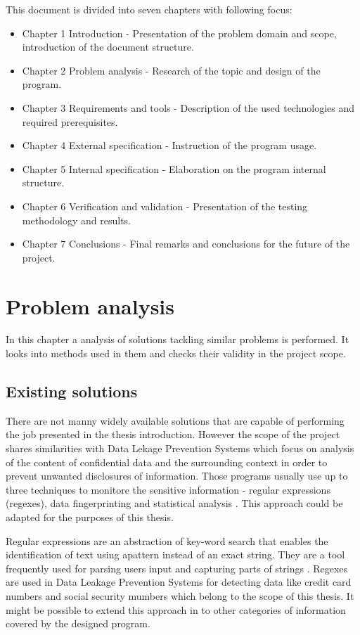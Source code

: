 \documentclass[a4paper,twoside,12pt]{book}
\begin{document}
This document is divided into seven chapters with following focus:

\begin{itemize}
   \item Chapter 1 Introduction - Presentation of the problem domain and scope, introduction of the document structure.
   \item Chapter 2 Problem analysis - Research of the topic and design of the program.
   \item Chapter 3 Requirements and tools - Description of the used technologies and required prerequisites.
   \item Chapter 4 External specification - Instruction of the program usage.
   \item Chapter 5 Internal specification - Elaboration on the program internal structure.
   \item Chapter 6 Verification and validation - Presentation of the testing methodology and results.
   \item Chapter 7 Conclusions - Final remarks and conclusions for the future of the project.
   \end{itemize}

\chapter{Problem analysis}

In this chapter a analysis of solutions tackling similar problems is performed. It looks into methods used in them and checks their validity in the project scope.

\section{Existing solutions}

There are not manny widely available solutions that are capable of performing the job presented in the thesis introduction. However the scope of the project shares
similarities with Data Lekage Prevention Systems which focus on analysis of the content of confidential data and the surrounding context in order to
prevent unwanted disclosures of information. Those programs usually use up to three techniques to monitore the sensitive information - regular expressions (regexes),
data fingerprinting and statistical analysis \cite{bib:articleDLPS}. This approach could be adapted for the purposes of this thesis. 

Regular expressions are an abstraction of key-word search that enables the identification of text using apattern instead of an exact string. They are a tool 
frequently used for parsing users input and capturing parts of strings \cite{bib:conferenceRegex}. Regexes are used in Data Leakage Prevention Systems for detecting 
data like credit card numbers and social security mumbers \cite{bib:articleDLPS} which belong to the scope of this thesis. It might be possible to extend this approach 
in to other categories of information covered by the designed program.
\end{document}
